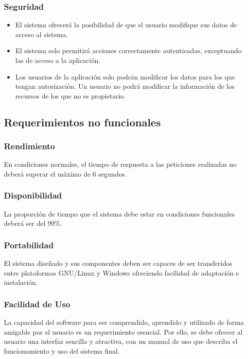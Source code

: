 \subsubsection*{Seguridad}
\begin{itemize}
\setlength\itemsep{1pt}
\item El sistema ofrecerá la posibilidad de que el usuario modifique sus datos de acceso al sistema.
\item El sistema solo permitirá acciones correctamente autenticadas, exceptuando las de acceso a la aplicación.
\item Los usuarios de la aplicación solo podrán modificar los datos para los que tengan autorización. Un usuario no podrá modificar la información de los recursos de los que no es propietario.
\end{itemize}


\subsection{Requerimientos no funcionales}


\subsubsection*{Rendimiento}
En condiciones normales, el tiempo de respuesta a las peticiones realizadas no deberá superar el máximo de 6 segundos.

\subsubsection*{Disponibilidad}
La proporción de tiempo que el sistema debe estar en condiciones funcionales deberá ser del 99\%.


\subsubsection*{Portabilidad}
El sistema diseñado y sus componentes deben ser capaces de ser transferidos entre plataformas GNU/Linux y Windows ofreciendo facilidad de adaptación e instalación.

\subsubsection*{Facilidad de Uso}
La capacidad del software para ser comprendido, aprendido y utilizado de forma amigable por el usuario es un requerimiento esencial. Por ello, se debe ofrecer al usuario una interfaz sencilla y atractiva, con un manual de uso que describa el funcionamiento y uso del sistema final.

